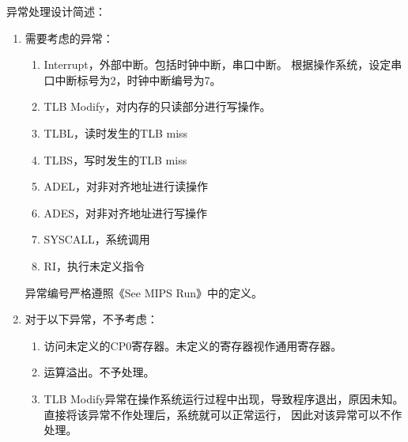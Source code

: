             异常处理设计简述：
            \begin{enumerate}
            \item
	        需要考虑的异常：
                \begin{enumerate}
                    \item
                    Interrupt，外部中断。包括时钟中断，串口中断。%
                    根据操作系统，设定串口中断标号为2，时钟中断编号为7。
                    \item
                    TLB Modify，对内存的只读部分进行写操作。
                    \item
                    TLBL，读时发生的TLB miss
                    \item
                    TLBS，写时发生的TLB miss
                    \item
                    ADEL，对非对齐地址进行读操作
                    \item
                    ADES，对非对齐地址进行写操作
                    \item
                    SYSCALL，系统调用
                    \item
                    RI，执行未定义指令
                \end{enumerate}
                异常编号严格遵照《See MIPS Run》中的定义。

            \item
            对于以下异常，不予考虑：
                \begin{enumerate}
                    \item
                    访问未定义的CP0寄存器。未定义的寄存器视作通用寄存器。
                    \item
                    运算溢出。不予处理。
                    \item
                    TLB Modify异常在操作系统运行过程中出现，导致程序退出，原因未知。%
                    直接将该异常不作处理后，系统就可以正常运行，%
                    因此对该异常可以不作处理。
                \end{enumerate}


\end{enumerate}
